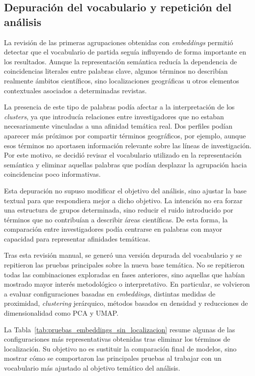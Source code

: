 \documentclass[11pt,spanish,listoffigures,listoftables]{tfgetsinf}
\begin{document}
\subsection{Depuración del vocabulario y repetición del análisis}

La revisión de las primeras agrupaciones obtenidas con \textit{embeddings} permitió detectar que el vocabulario de partida seguía influyendo de forma importante en los resultados. Aunque la representación semántica reducía la dependencia de coincidencias literales entre palabras clave, algunos términos no describían realmente ámbitos científicos, sino localizaciones geográficas u otros elementos contextuales asociados a determinadas revistas.

La presencia de este tipo de palabras podía afectar a la interpretación de los \textit{clusters}, ya que introducía relaciones entre investigadores que no estaban necesariamente vinculadas a una afinidad temática real. Dos perfiles podían aparecer más próximos por compartir términos geográficos, por ejemplo, aunque esos términos no aportasen información relevante sobre las líneas de investigación. Por este motivo, se decidió revisar el vocabulario utilizado en la representación semántica y eliminar aquellas palabras que podían desplazar la agrupación hacia coincidencias poco informativas.

Esta depuración no supuso modificar el objetivo del análisis, sino ajustar la base textual para que respondiera mejor a dicho objetivo. La intención no era forzar una estructura de grupos determinada, sino reducir el ruido introducido por términos que no contribuían a describir áreas científicas. De esta forma, la comparación entre investigadores podía centrarse en palabras con mayor capacidad para representar afinidades temáticas.

Tras esta revisión manual, se generó una versión depurada del vocabulario y se repitieron las pruebas principales sobre la nueva base temática. No se repitieron todas las combinaciones exploradas en fases anteriores, sino aquellas que habían mostrado mayor interés metodológico o interpretativo. En particular, se volvieron a evaluar configuraciones basadas en \textit{embeddings}, distintas medidas de proximidad, \textit{clustering} jerárquico, métodos basados en densidad y reducciones de dimensionalidad como PCA y UMAP.

La Tabla~\ref{tab:pruebas_embeddings_sin_localizacion} resume algunas de las configuraciones más representativas obtenidas tras eliminar los términos de localización. Su objetivo no es sustituir la comparación final de modelos, sino mostrar cómo se comportaron las principales pruebas al trabajar con un vocabulario más ajustado al objetivo temático del análisis.
\end{document}
